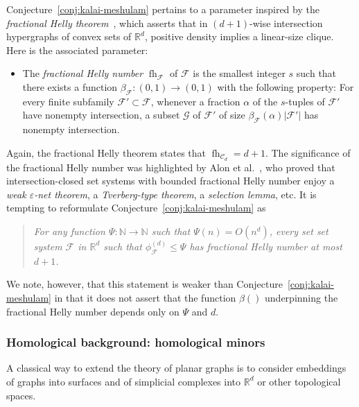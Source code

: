 \documentclass[a4paper,UKenglish,thm-restate]{article}
\newcommand{\R}{\mathbb{R}}
\newcommand{\N}{\mathbb{N}}
\newcommand{\C}{\mathcal{C}}
\newcommand{\F}{\mathcal{F}}
\newcommand{\G}{\mathcal{G}}
\DeclareMathOperator{\fh}{fh}
\newcommand{\defn}[1]{\emph{\color{violet}#1}}
\begin{document}
\medskip

Conjecture~\ref{conj:kalai-meshulam} pertains to a parameter inspired by the \emph{fractional Helly theorem}~\cite{katchalski1979problem,kalai1984intersection}, which asserts that in $(d+1)$-wise intersection hypergraphs of convex sets of $\R^d$, positive density implies a linear-size clique. Here is the associated parameter:

\begin{itemize}
\item The \defn{fractional Helly number} $\fh_\F$ of $\F$ is the smallest integer $s$ such that there exists a function $\beta_\F:(0,1)\rightarrow (0,1)$ with the following property: For every finite subfamily $\F'\subset \F$, whenever a fraction $\alpha$ of the $s$-tuples of $\F'$ have nonempty intersection, a subset $\G$ of $\F'$ of size $\beta_\F(\alpha)|\F'|$ has nonempty intersection.
\end{itemize}

\noindent
Again, the fractional Helly theorem states that $\fh_{\C_ d} = d+1$. The significance of the fractional Helly number was highlighted by Alon et al.~\cite{transversal-hypergraph}, who proved that intersection-closed set systems with bounded fractional Helly number enjoy a \emph{weak $\varepsilon$-net theorem}, a \emph{Tverberg-type theorem}, a \emph{selection lemma}, etc. It is tempting to reformulate Conjecture~\ref{conj:kalai-meshulam} as

\begin{quote}
  \emph{For any function $\Psi: \N \to \N$ such that $\Psi(n) = O(n^d)$, every set set system $\F$ in $\R^d$ such that $\phi_{\F}^{(d)} \le \Psi$ has fractional Helly number at most $d+1$.}
\end{quote}

\noindent We note, however, that this statement is weaker than Conjecture~\ref{conj:kalai-meshulam} in that it does not assert that the function $\beta()$ underpinning the fractional Helly number depends only on $\Psi$ and $d$.


\subsubsection{Homological background: homological minors}

A classical way to extend the theory of planar graphs is to consider embeddings of graphs into surfaces and of simplicial complexes into $\R^d$ or other topological spaces.

\medskip
\end{document}
